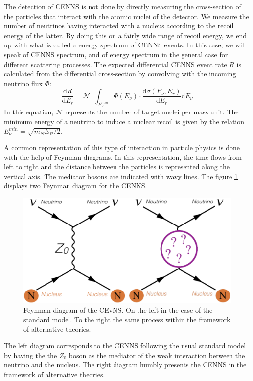 The detection of CENNS is not done by directly measuring the cross-section of the particles that interact with the atomic nuclei of the detector. We measure the number of neutrinos having interacted with a nucleus according to the recoil energy of the latter. By doing this on a fairly wide range of recoil energy, we end up with what is called a energy spectrum of CENNS events. In this case, we will speak of CENNS spectrum, and of energy spectrum in the general case for different scattering processes. The expected differential CENNS event rate $R$ is calculated from the differential cross-section by convolving with the incoming neutrino flux $\Phi$:
\begin{equation}
\frac{\mathrm{d} R}{\mathrm{d} E_r}
=
\mathcal{N} \cdot
\int_{E_{\nu}^{min}}
\Phi(E_{\nu})
\cdot
\frac{\mathrm{d} \sigma (E_{\nu}, E_r) }{\mathrm{d} E_r} \mathrm{d} E_{\nu}
\end{equation}
In this equation, $\mathcal{N}$ represents the number of target nuclei per mass unit. The minimum energy of a neutrino to induce a nuclear recoil is given by the relation $E_{\nu}^{min}= \sqrt{m_N E_R /2}$.

A common representation of this type of interaction in particle physics is done with the help of Feynman diagrams. In this representation, the time flows from left to right and the distance between the particles is represented along the vertical axis. The mediator bosons are indicated with wavy lines. The figure \ref{fig:cenns-feynman} displays two Feynman diagram for the CENNS.
\begin{figure}
\centering
\includegraphics [scale=1]{Figures/Introduction/cenns_feynman.png}
\caption{Feynman diagram of the CEvNS. On the left in the case of the standard model. To the right the same process within the framework of alternative theories.}
\label{fig:cenns-feynman}
\end{figure}
The left diagram corresponds to the CENNS following the usual standard model by having the the $Z_0$ boson as the mediator of the weak interaction between the neutrino and the nucleus. The right diagram humbly presents the CENNS in the framework of alternative theories.


